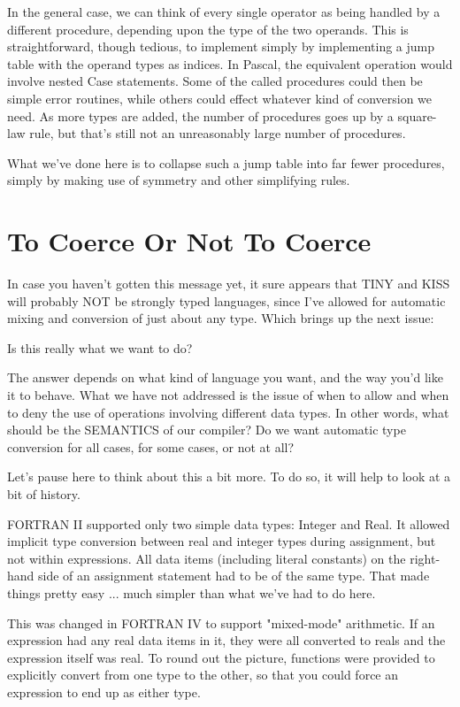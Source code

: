 In the general  case, we  can  think of every single operator as being handled by  a  different procedure, depending upon the type of the two operands. This is straightforward, though tedious, to implement simply by implementing  a  jump  table with the operand types  as indices. In Pascal, the  equivalent  operation  would involve nested Case statements. Some  of the called procedures could then be simple  error  routines, while others could effect whatever kind of conversion we need. As more  types  are  added, the number of procedures goes up by a square-law rule, but that's still not an unreasonably large number of procedures.

What  we've  done  here is to collapse such a jump table into far fewer  procedures, simply by making use  of  symmetry  and  other simplifying rules.

\section{To Coerce Or Not To Coerce}

In case you haven't gotten this message yet, it sure appears that TINY and KISS will  probably   NOT   be strongly typed languages, since I've allowed for  automatic  mixing  and conversion of just about any type. Which brings up the next issue:

Is this really what we want to do?

The answer depends on what kind of language you want, and the way you'd like it to behave. What we have not addressed is the issue of when to allow and when to deny the use of operations involving different  data  types. In other  words, what  should  be  the SEMANTICS of our compiler?   Do we want automatic type conversion for all cases, for some cases, or not at all?

Let's pause here to think about this a bit more. To  do  so, it will help to look at a bit of history.

FORTRAN  II supported only two simple  data  types:  Integer  and Real. It  allowed implicit type conversion  between  real  and integer types during assignment, but not within expressions. All data items (including literal constants) on  the  right-hand side of an assignment statement had to be of the same type. That made things pretty easy  ... much  simpler  than what we've had to do here.

This  was  changed  in  FORTRAN   IV   to   support  "mixed-mode" arithmetic. If an expression had any real data items in it, they were all converted to reals and the expression  itself  was real. To round out  the  picture, functions were provided to explicitly convert  from  one  type to the other, so that you could force an expression to end up as either type.

